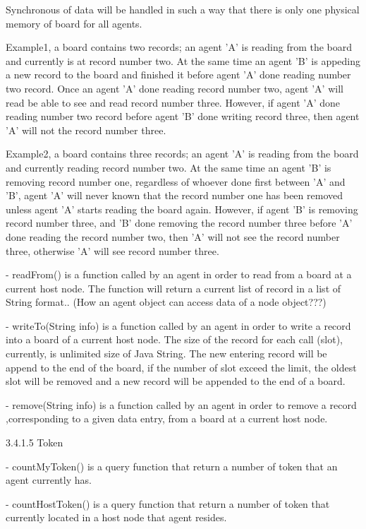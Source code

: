 \begin{description}
\begin{description}
\begin{description}
\begin{description}
Synchronous of data will be handled in such a way that there is only one physical memory of board for all agents.

Example1, a board contains two records; an agent 'A' is reading from the board and currently is at record number two. At the same time an agent 'B' is appeding a new record to the board and finished it before agent 'A' done reading number two record. Once an agent 'A' done reading record number two, agent 'A' will read be able to see and read record number three. However, if agent 'A' done reading number two record before agent 'B' done writing record three, then agent 'A' will not the record number three.

Example2, a board contains three records; an agent 'A' is reading from the board and currently reading record number two. At the same time an agent 'B' is removing record number one, regardless of whoever done first between 'A' and 'B', agent 'A' will never known that the record number one has been removed unless agent 'A' starts reading the board again. However, if agent 'B' is removing record number three, and 'B' done removing the record number three before 'A' done reading the record number two, then 'A' will not see the record number three, otherwise 'A' will see record number three.

- readFrom() is a function called by an agent in order to read from a board at a current host node. The function will return a current list of record in a list of String format..  (How an agent object can access data of a node object???)

- writeTo(String info) is a function called by an agent in order to write a record into a board of a current host node. The size of the record for each call (slot), currently, is unlimited size of Java String. The new entering record will be append to the end of the board, if the number of slot exceed the limit, the oldest slot will be removed and a new record will be appended to the end of a board.

- remove(String info) is a function called by an agent in order to remove a record ,corresponding to a given data entry, from a board at a current host node.


3.4.1.5 Token

- countMyToken() is a query function that return a number of token that an agent currently has.

- countHostToken() is a query function that return a number of token that currently located in a host node that agent resides.


\end{description}
\end{description}
\end{description}
\end{description}
